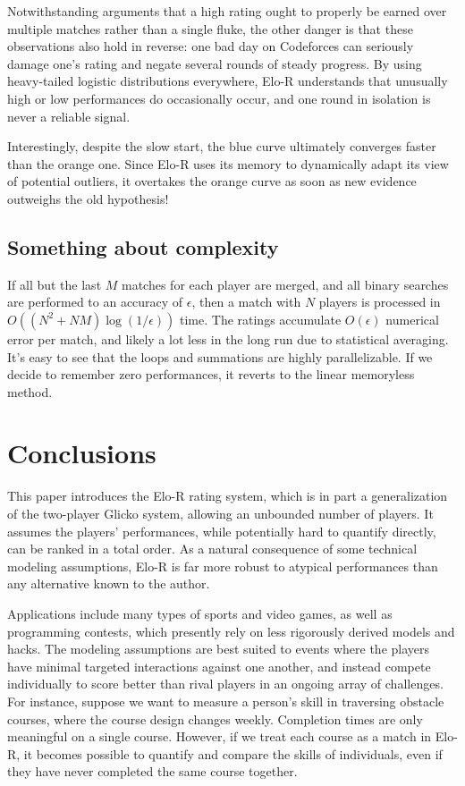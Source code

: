 \documentclass{article}
\begin{document}
Notwithstanding arguments that a high rating ought to properly be earned over multiple matches rather than a single fluke, the other danger is that these observations also hold in reverse: one bad day on Codeforces can seriously damage one's rating and negate several rounds of steady progress. By using heavy-tailed logistic distributions everywhere, Elo-R understands that unusually high or low performances do occasionally occur, and one round in isolation is never a reliable signal.

Interestingly, despite the slow start, the blue curve ultimately converges faster than the orange one. Since Elo-R uses its memory to dynamically adapt its view of potential outliers, it overtakes the orange curve as soon as new evidence outweighs the old hypothesis!

\subsection{Something about complexity}

If all but the last $M$ matches for each player are merged, and all binary searches are performed to an accuracy of $\epsilon$, then a match with $N$ players is processed in $O((N^2+NM)\log(1/\epsilon))$ time. The ratings accumulate $O(\epsilon)$ numerical error per match, and likely a lot less in the long run due to statistical averaging.  It's easy to see that the loops and summations are highly parallelizable. If we decide to remember zero performances, it reverts to the linear memoryless method. 

\section{Conclusions}

This paper introduces the Elo-R rating system, which is in part a generalization of the two-player Glicko system, allowing an unbounded number of players. It assumes the players' performances, while potentially hard to quantify directly, can be ranked in a total order. As a natural consequence of some technical modeling assumptions, Elo-R is far more robust to atypical performances than any alternative known to the author.

Applications include many types of sports and video games, as well as programming contests, which presently rely on less rigorously derived models and hacks. The modeling assumptions are best suited to events where the players have minimal targeted interactions against one another, and instead compete individually to score better than rival players in an ongoing array of challenges. For instance, suppose we want to measure a person's skill in traversing obstacle courses, where the course design changes weekly. Completion times are only meaningful on a single course. However, if we treat each course as a match in Elo-R, it becomes possible to quantify and compare the skills of individuals, even if they have never completed the same course together.
\end{document}
